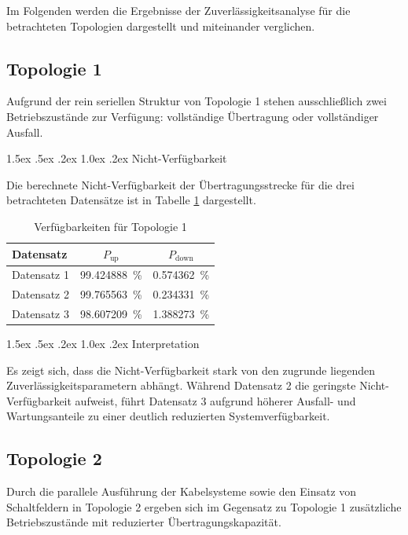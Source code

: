 \documentclass[a4paper,12pt]{article}
\makeatletter
\renewcommand\paragraph{\@startsection{paragraph}{4}{\z@}%
	{1.5ex \@plus .5ex \@minus .2ex}%
	{1.0ex \@plus .2ex}%
	{\normalfont\normalsize\bfseries}}%
\makeatother
\begin{document}
Im Folgenden werden die Ergebnisse der Zuverlässigkeitsanalyse für die
betrachteten Topologien dargestellt und miteinander verglichen.

\subsection{Topologie 1}

Aufgrund der rein seriellen Struktur von Topologie 1 stehen
ausschließlich zwei Betriebszustände zur Verfügung: vollständige
Übertragung oder vollständiger Ausfall.

\paragraph{Nicht-Verfügbarkeit}

Die berechnete Nicht-Verfügbarkeit der Übertragungsstrecke für die drei
betrachteten Datensätze ist in Tabelle \ref{tab:topo1_nv} dargestellt.

\begin{table}[h]
\centering
\begin{tabular}{lcc}
\hline
Datensatz & $P_\text{up}$ & $P_\text{down}$ \\
\hline
Datensatz 1 & \qty{99.424888}{\percent} & \qty{0.574362}{\percent} \\
Datensatz 2 & \qty{99.765563}{\percent} & \qty{0.234331}{\percent} \\
Datensatz 3 & \qty{98.607209}{\percent} & \qty{1.388273}{\percent}\\
\hline
\end{tabular}
\caption{Verfügbarkeiten für Topologie 1}
\label{tab:topo1_nv}
\end{table}

\paragraph{Interpretation}

Es zeigt sich, dass die Nicht-Verfügbarkeit stark von den zugrunde
liegenden Zuverlässigkeitsparametern abhängt. Während Datensatz 2 die
geringste Nicht-Verfügbarkeit aufweist, führt Datensatz 3 aufgrund
höherer Ausfall- und Wartungsanteile zu einer deutlich reduzierten
Systemverfügbarkeit.

\subsection{Topologie 2}

Durch die parallele Ausführung der
Kabelsysteme sowie den Einsatz von Schaltfeldern in Topologie 2 ergeben sich im
Gegensatz zu Topologie 1 zusätzliche Betriebszustände mit reduzierter
Übertragungskapazität.
\end{document}
